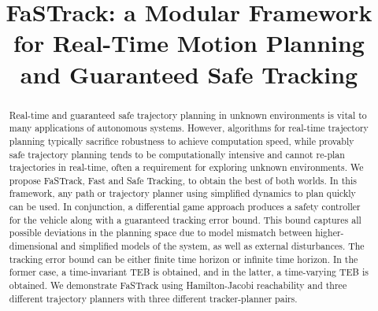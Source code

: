 \documentclass[journal]{IEEEtran}
\title{\LARGE \bf FaSTrack: a Modular Framework for Real-Time Motion Planning and Guaranteed Safe Tracking}
\author{}
\begin{document}
\maketitle
\thispagestyle{empty}
\pagestyle{empty}

\begin{abstract}
Real-time and guaranteed safe trajectory planning in unknown environments is vital to many applications of autonomous systems. 
However, algorithms for real-time trajectory planning typically sacrifice robustness to achieve computation speed, while provably safe trajectory planning tends to be computationally intensive and cannot re-plan trajectories in real-time, often a requirement for exploring unknown environments. 
We propose FaSTrack, Fast and Safe Tracking, to obtain the best of both worlds. 
In this framework, any path or trajectory planner using simplified dynamics to plan quickly can be used. 
In conjunction, a differential game approach produces a safety controller for the vehicle along with a guaranteed tracking error bound. 
This bound captures all possible deviations in the planning space due to model mismatch between higher-dimensional and simplified models of the system, as well as external disturbances.
The tracking error bound can be either finite time horizon or infinite time horizon.
In the former case, a time-invariant TEB is obtained, and in the latter, a time-varying TEB is obtained.
We demonstrate FaSTrack using Hamilton-Jacobi reachability and three different trajectory planners with three different tracker-planner pairs.
\end{abstract}














\end{document}
